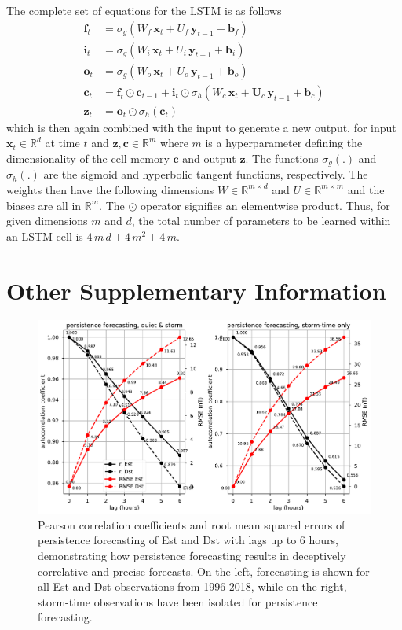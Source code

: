 \documentclass{agujournal2018}
\begin{document}
The complete set of equations for the LSTM is as follows
\begin{eqnarray*}
\mathbf{f}_t &= \sigma_g(W_f\,\mathbf{x}_t +U_f\,\mathbf{y}_{t-1} + \mathbf{b}_f) \\
\mathbf{i}_t &= \sigma_g(W_i\,\mathbf{x}_t + U_i\,\mathbf{y}_{t-1} + \mathbf{b}_i) \\
\mathbf{o}_t &= \sigma_g(W_o\,\mathbf{x}_t + U_o\,\mathbf{y}_{t-1} + \mathbf{b}_o) \\
\mathbf{c}_t &= \mathbf{f}_t \odot \mathbf{c}_{t-1} + \mathbf{i}_t \odot \sigma_h(W_c\,\mathbf{x}_t + \mathbf{U}_c\,\mathbf{y}_{t-1} + \mathbf{b}_c) \\
\mathbf{z}_t &= \mathbf{o}_t \odot \sigma_h(\mathbf{c}_t)
\end{eqnarray*}
which is then again combined with the input to generate a new output.
for input $\mathbf{x}_t \in \mathbb{R}^d$ at time $t$ and $\mathbf{z}, \mathbf{c} \in \mathbb{R}^m$ where $m$ is a hyperparameter defining the dimensionality of the cell memory $\mathbf{c}$ and output $\mathbf{z}$. The functions $\sigma_g(.)$ and $\sigma_h(.)$ are the sigmoid and hyperbolic tangent functions, respectively. The weights then have the following dimensions $W \in \mathbb{R}^{m\times d}$ and  $U \in \mathbb{R}^{m\times m}$ and the biases are all in $\mathbb{R}^m$. The $\odot$ operator signifies an elementwise product. Thus, for given dimensions $m$ and $d$, the total number of parameters to be learned within an LSTM cell is $4\,m\,d + 4\,m^2 + 4\,m$.

\section*{Other Supplementary Information}

\begin{figure}[htbp]
   \centering
   \includegraphics[width=1\textwidth]{figures/supplement/persistence.pdf}
   \caption{Pearson correlation coefficients and root mean squared errors of persistence forecasting of Est and Dst with lags up to 6 hours, demonstrating how persistence forecasting results in deceptively correlative and precise forecasts. On the left, forecasting is shown for all Est and Dst observations from 1996-2018, while on the right, storm-time observations have been isolated for persistence forecasting.}
   \label{fig:persistence}
\end{figure}
\end{document}
